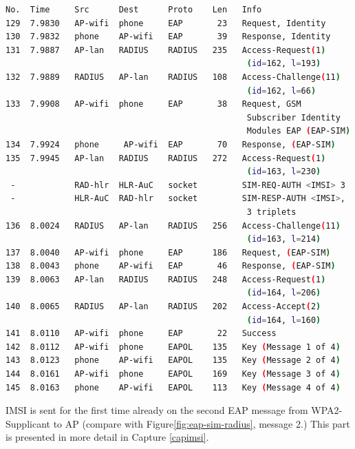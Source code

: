 \documentclass[12pt,a4paper,english]{tutthesis}
\begin{document}
\begin{otherlanguage}{english}

\begin{lstlisting}[language=bash,label=eap-sim-capture,caption={Successful EAP-SIM Authentication}]
No.  Time     Src      Dest      Proto    Len   Info                                  
129  7.9830   AP-wifi  phone     EAP       23   Request, Identity                     
130  7.9832   phone    AP-wifi   EAP       39   Response, Identity                    
131  7.9887   AP-lan   RADIUS    RADIUS   235   Access-Request(1) 
                                                 (id=162, l=193)     
132  7.9889   RADIUS   AP-lan    RADIUS   108   Access-Challenge(11) 
                                                 (id=162, l=66)   
133  7.9908   AP-wifi  phone     EAP       38   Request, GSM 
                                                 Subscriber Identity 
                                                 Modules EAP (EAP-SIM)                 
134  7.9924   phone     AP-wifi  EAP       70   Response, (EAP-SIM)                 
135  7.9945   AP-lan   RADIUS    RADIUS   272   Access-Request(1)
                                                 (id=163, l=230)     
 -            RAD-hlr  HLR-AuC   socket         SIM-REQ-AUTH <IMSI> 3                 
 -            HLR-AuC  RAD-hlr   socket         SIM-RESP-AUTH <IMSI>,
                                                 3 triplets      
136  8.0024   RADIUS   AP-lan    RADIUS   256   Access-Challenge(11)
                                                 (id=163, l=214)  
137  8.0040   AP-wifi  phone     EAP      186   Request, (EAP-SIM) 
138  8.0043   phone    AP-wifi   EAP       46   Response, (EAP-SIM) 
139  8.0063   AP-lan   RADIUS    RADIUS   248   Access-Request(1)
                                                 (id=164, l=206)     
140  8.0065   RADIUS   AP-lan    RADIUS   202   Access-Accept(2)
                                                 (id=164, l=160)      
141  8.0110   AP-wifi  phone     EAP       22   Success                          
142  8.0112   AP-wifi  phone     EAPOL    135   Key (Message 1 of 4)                  
143  8.0123   phone    AP-wifi   EAPOL    135   Key (Message 2 of 4)                  
144  8.0161   AP-wifi  phone     EAPOL    169   Key (Message 3 of 4)                  
145  8.0163   phone    AP-wifi   EAPOL    113   Key (Message 4 of 4)     
\end{lstlisting}



IMSI is sent for the first time already on the second EAP message from 
WPA2-Supplicant to AP (compare with Figure\ref{fig:eap-sim-radius}, message 2.)
This part is presented in more detail in Capture \ref{capimsi}.


\end{otherlanguage}
\end{document}
